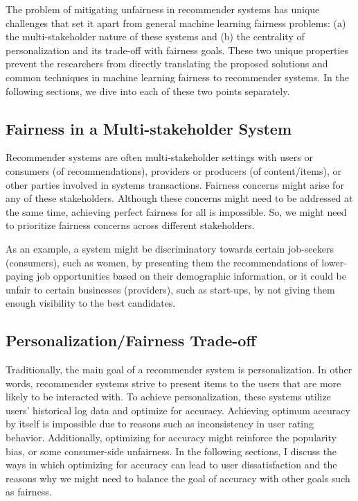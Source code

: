 The problem of mitigating unfairness in recommender systems has unique challenges that set it apart from general machine learning fairness problems: (a) the multi-stakeholder nature of these systems and (b) the centrality of personalization and its trade-off with fairness goals. These two unique properties prevent the researchers from directly translating the proposed solutions and common techniques in machine learning fairness to recommender systems. In the following sections, we dive into each of these two points separately.


\subsection{Fairness in a Multi-stakeholder System}

Recommender systems are often multi-stakeholder settings with users or consumers (of recommendations), providers or producers (of content/items), or other parties involved in systems transactions. Fairness concerns might arise for any of these stakeholders. Although these concerns might need to be addressed at the same time, achieving perfect fairness for all is impossible. So, we might need to prioritize fairness concerns across different stakeholders.

As an example, a system might be discriminatory towards certain job-seekers (consumers), such as women, by presenting them the recommendations of lower-paying job opportunities based on their demographic information, or it could be unfair to certain businesses (providers), such as start-ups, by not giving them enough visibility to the best candidates.


\subsection{Personalization/Fairness Trade-off}

Traditionally, the main goal of a recommender system is personalization. In other words, recommender systems strive to present items to the users that are more likely to be interacted with. To achieve personalization, these systems utilize users' historical log data and optimize for accuracy. Achieving optimum accuracy by itself is impossible due to reasons such as inconsistency in user rating behavior. Additionally, optimizing for accuracy might reinforce the popularity bias, or some consumer-side unfairness. In the following sections, I discuss the ways in which optimizing for accuracy can lead to user dissatisfaction and the reasons why we might need to balance the goal of accuracy with other goals such as fairness.


